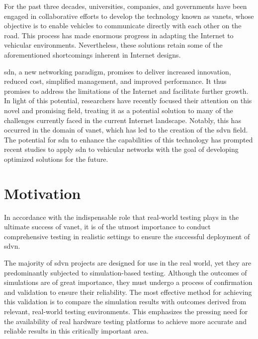 For the past three decades, universities, companies, and governments have been engaged in collaborative efforts to develop the technology known as \glspl{vanet}, whose objective is to enable vehicles to communicate directly with each other on the road.
This process has made enormous progress in adapting the Internet to vehicular environments. Nevertheless, these solutions retain some of the aforementioned shortcomings inherent in Internet designs.

\gls{sdn}, a new networking paradigm, promises to deliver increased innovation, reduced cost, simplified management, and improved performance.
It thus promises to address the limitations of the Internet and facilitate further growth. In light of this potential, researchers have recently focused their attention on this novel and promising field, treating it as a potential solution to many of the challenges currently faced in the current Internet landscape.
Notably, this has occurred in the domain of \gls{vanet}, which has led to the creation of the \gls{sdvn} field. The potential for \gls{sdn} to enhance the capabilities of this technology has prompted recent studies to apply \gls{sdn} to vehicular networks with the goal of developing optimized solutions for the future.


\section{Motivation} %
\label{sec:motivation}


In accordance with the indispensable role that real-world testing plays in the ultimate success of \gls{vanet}, it is of the utmost importance to conduct comprehensive testing in realistic settings to ensure the successful deployment of \gls{sdvn}. 

The majority of \gls{sdvn} projects are designed for use in the real world, yet they are predominantly subjected to simulation-based testing. Although the outcomes of simulations are of great importance, they must undergo a process of confirmation and validation to ensure their reliability. The most effective method for achieving this validation is to compare the simulation results with outcomes derived from relevant, real-world testing environments. This emphasizes the pressing need for the availability of real hardware testing platforms to achieve more accurate and reliable results in this critically important area. 

